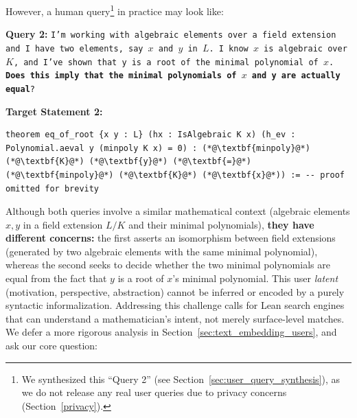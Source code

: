 \documentclass{article} %
\begin{document}
However, a human query\footnote{We synthesized this ``Query 2'' (see Section~\ref{sec:user_query_synthesis}), as we do not release any real user queries due to privacy concerns (Section~\ref{privacy}).} in practice may look like:

{\small
\textbf{Query 2:}
\texttt{I'm working with algebraic elements over a field extension and I have two elements, say $x$ and $y$ in $L$. I know $x$ is algebraic over $K$, and I've shown that y is a root of the minimal polynomial of $x$. \textbf{Does this imply that the minimal polynomials of $x$ and y are actually equal}?}

\textbf{Target Statement 2:}
\begin{lstlisting}
theorem eq_of_root {x y : L} (hx : IsAlgebraic K x) (h_ev : Polynomial.aeval y (minpoly K x) = 0) : (*@\textbf{minpoly}@*) (*@\textbf{K}@*) (*@\textbf{y}@*) (*@\textbf{=}@*) (*@\textbf{minpoly}@*) (*@\textbf{K}@*) (*@\textbf{x}@*)) := -- proof omitted for brevity
\end{lstlisting}
}



Although both queries involve a similar mathematical context (algebraic elements $x, y$ in a field extension $L / K$ and their minimal polynomials),
\textbf{they have different concerns:}
the first
asserts
an isomorphism between field extensions (generated by two algebraic elements with the same minimal polynomial),
whereas the second seeks
to decide whether the two minimal polynomials are equal from the fact that $y$ is a root of $x$'s minimal polynomial.
This user \emph{latent} (motivation, perspective, abstraction)
cannot be inferred or encoded by a purely syntactic informalization.
Addressing this challenge calls for Lean search engines
that can understand a mathematician’s intent, not merely surface-level matches.
We defer a more rigorous analysis in Section~\ref{sec:text_embedding_users},
and ask our core question:
\vspace{-0.5em}
\begin{center}
\end{center}
\vspace{-0.5em}
\end{document}
